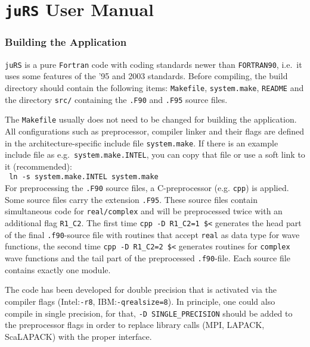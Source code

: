 \documentclass[12pt,BCOR8mm,noappendixprefix,nochapterprefix,bibtotoc,idxtotoc,openbib,tablecaptionabove]{scrbook}
\newcommand{\juRS}{\texttt{juRS}} %
\newcommand{\ttt}[1]{\texttt{#1}}
\begin{document}
\chapter*{\juRS{} User Manual} \label{sec:MAN}

\setcounter{chapter}{1}

\subsection{Building the Application} \label{sec:MAN_compilation}


\juRS{} is a pure \ttt{Fortran} code with coding standards newer than \ttt{FORTRAN90}, i.e.~it
uses some features of the '95 and 2003 standards. Before compiling, the build directory 
should contain the following items: \ttt{Makefile}, \ttt{system.make}, \ttt{README} 
and the directory \ttt{src/} containing the \ttt{.F90} and \ttt{.F95} source files.

The \ttt{Makefile} usually does not need to be changed for building the application. 
All configurations such as preprocessor, compiler linker and their flags are defined 
in the architecture-specific include file \ttt{system.make}. If there is an example 
include file as e.g.\ \ttt{system.make.INTEL}, you can copy that file or use a soft 
link to it (recommended):\\
\ttt{  ln -s system.make.INTEL system.make}\\
For preprocessing the \ttt{.F90} source files, a C-preprocessor (e.g. \ttt{cpp}) is 
applied. Some source files carry the extension \ttt{.F95}. These source files contain 
simultaneous code for \ttt{real/complex} and will be preprocessed twice with an 
additional flag \ttt{R1\_C2}. The first time \ttt{cpp -D R1\_C2=1 \$<} generates the 
head part of the final \ttt{.f90}-source file with routines that accept \ttt{real} 
as data type for wave functions, the second time \ttt{cpp -D R1\_C2=2 \$<} generates 
routines for \ttt{complex} wave functions and the tail part of the preprocessed 
\ttt{.f90}-file. Each source file contains exactly one module.

The code has been developed for double precision that is activated via the compiler 
flags (Intel:\ttt{-r8}, IBM:\ttt{-qrealsize=8}). In principle, one could also 
compile in single precision, for that, \ttt{-D SINGLE\_PRECISION} should be added 
to the preprocessor flags in order to replace library calls (MPI, LAPACK, ScaLAPACK) 
with the proper interface.
\end{document}
